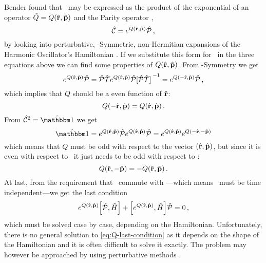             Bender found that \hC\ may be expressed as the product of the exponential of an operator $\hQ = Q\pqty{\hvr,\hvp}$ and the Parity operator \hP,
            \begin{equation}
                \label{eq:C-exponential}
                \hC = \myexp{Q\pqty{\hvr,\hvp}}\hP
                \mycomma
            \end{equation}
            by looking into perturbative, \PT-Symmetric, non-Hermitian expansions of the Harmonic Oscillator's Hamiltonian \cite{bender2024}. If we substitute this form for \hC\ in the three equations above we can find some properties of $Q\pqty{\hvr,\hvp}$. From \PT-Symmetry we get
            \begin{equation*}
                \myexp{Q\pqty{\hvr,\hvp}}\hP
                = \PTtransform{\myexp{Q\pqty{\hvr,\hvp}}\hP}
                = \myexp{Q\pqty{-\hvr,\hvp}}\hP
                \mycomma
            \end{equation*}
            which implies that $Q$ should be a even function of $\hat{\vb{r}}$:
            \begin{equation}
                Q\pqty{-\hvr,\hvp} = Q\pqty{\hvr,\hvp}
                \myperiod
            \end{equation}
            From $\hC^2 = \hidM$ we get
            \begin{equation*}
                \hidM = \myexp{Q\pqty{\hvr,\hvp}} \hP \myexp{Q\pqty{\hvr,\hvp}} \hP = \myexp{Q\pqty{\hvr,\hvp}} \myexp{Q\pqty{-\hvr,-\hvp}}
            \end{equation*}
            which means that $Q$ must be odd with respect to the vector $\pqty{\hvr,\hvp}$, but since it is even with respect to \hvr\ it just needs to be odd with respect to {\hvp}:
            \begin{equation}
                Q\pqty{\hvr,-\hvp} = -Q\pqty{\hvr,\hvp}
                \myperiod
            \end{equation}
            At last, from the requirement that \hC\ commute with \hH---which means \hC\ must be time independent---we get the last condition
            \begin{equation}
                \label{eq:Q-last-condition}
                \myexp{Q\pqty{\hvr,\hvp}} \comm{\hP}{\hH} + \comm{\myexp{Q\pqty{\hvr,\hvp}}}{\hH} \hP = 0
                \mycomma
            \end{equation}
            which must be solved case by case, depending on the Hamiltonian. Unfortunately, there is no general solution to \eqref{eq:Q-last-condition} as it depends on the shape of the Hamiltonian and it is often difficult to solve it exactly. The problem may however be approached by using perturbative methods \cite{bender2024}.

